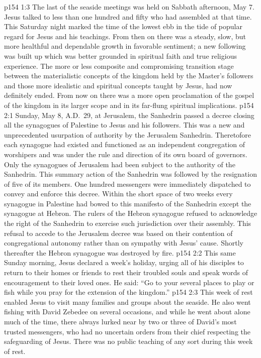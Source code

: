 \vs p154 1:3 The last of the seaside meetings was held on Sabbath afternoon, May 7. Jesus talked to less than one hundred and fifty who had assembled at that time. This Saturday night marked the time of the lowest ebb in the tide of popular regard for Jesus and his teachings. From then on there was a steady, slow, but more healthful and dependable growth in favorable sentiment; a new following was built up which was better grounded in spiritual faith and true religious experience. The more or less composite and compromising transition stage between the materialistic concepts of the kingdom held by the Master’s followers and those more idealistic and spiritual concepts taught by Jesus, had now definitely ended. From now on there was a more open proclamation of the gospel of the kingdom in its larger scope and in its far\hyp{}flung spiritual implications.\plusone
{}
\vs p154 2:1 Sunday, May 8, A.D.~29, at Jerusalem, the Sanhedrin passed a decree closing all the synagogues of Palestine to Jesus and his followers. This was a new and unprecedented usurpation of authority by the Jerusalem Sanhedrin. Theretofore each synagogue had existed and functioned as an independent congregation of worshipers and was under the rule and direction of its own board of governors. Only the synagogues of Jerusalem had been subject to the authority of the Sanhedrin. This summary action of the Sanhedrin was followed by the resignation of five of its members. One hundred messengers were immediately dispatched to convey and enforce this decree. Within the short space of two weeks every synagogue in Palestine had bowed to this manifesto of the Sanhedrin except the synagogue at Hebron. The rulers of the Hebron synagogue refused to acknowledge the right of the Sanhedrin to exercise such jurisdiction over their assembly. This refusal to accede to the Jerusalem decree was based on their contention of congregational autonomy rather than on sympathy with Jesus’ cause. Shortly thereafter the Hebron synagogue was destroyed by fire.\plusone
\pc \vs p154 2:2 This same Sunday morning, Jesus declared a week’s holiday, urging all of his disciples to return to their homes or friends to rest their troubled souls and speak words of encouragement to their loved ones. He said: \textcolor{ubdarkred}{“Go to your several places to play or fish while you pray for the extension of the kingdom.”}
\vs p154 2:3 This week of rest enabled Jesus to visit many families and groups about the seaside. He also went fishing with David Zebedee on several occasions, and while he went about alone much of the time, there always lurked near by two or three of David’s most trusted messengers, who had no uncertain orders from their chief respecting the safeguarding of Jesus. There was no public teaching of any sort during this week of rest.
